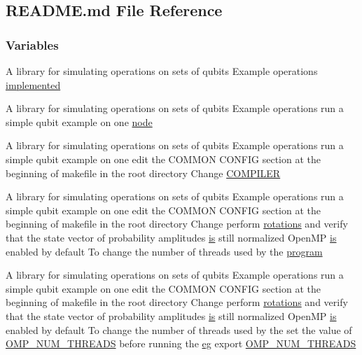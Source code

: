 \hypertarget{README_8md}{
\subsection{README.md File Reference}
\label{README_8md}
}
\subsubsection*{Variables}
\begin{DoxyCompactItemize}
\item 
A library for simulating operations on sets of qubits Example operations \hyperlink{README_8md_a5b6d5263988c72168a803d19675d481d}{implemented}
\item 
A library for simulating operations on sets of qubits Example operations run a simple qubit example on one \hyperlink{README_8md_a76fcdcc459e3177b276f62e5e4f9f987}{node}
\item 
A library for simulating operations on sets of qubits Example operations run a simple qubit example on one edit the COMMON CONFIG section at the beginning of makefile in the root directory Change \hyperlink{README_8md_ad6a8565e90f4cb2414688c39bcf9efa8}{COMPILER}
\item 
A library for simulating operations on sets of qubits Example operations run a simple qubit example on one edit the COMMON CONFIG section at the beginning of makefile in the root directory Change perform \hyperlink{README_8md_aa51a655a099aacfa420285f13958dee7}{rotations} and verify that the state vector of probability amplitudes \hyperlink{README_8md_a2a622829425af2df994a6f7c6deb0c91}{is} still normalized OpenMP \hyperlink{README_8md_a2a622829425af2df994a6f7c6deb0c91}{is} enabled by default To change the number of threads used by the \hyperlink{README_8md_ad51f198e6518042d9d4721d7ffe92d71}{program}
\item 
A library for simulating operations on sets of qubits Example operations run a simple qubit example on one edit the COMMON CONFIG section at the beginning of makefile in the root directory Change perform \hyperlink{README_8md_aa51a655a099aacfa420285f13958dee7}{rotations} and verify that the state vector of probability amplitudes \hyperlink{README_8md_a2a622829425af2df994a6f7c6deb0c91}{is} still normalized OpenMP \hyperlink{README_8md_a2a622829425af2df994a6f7c6deb0c91}{is} enabled by default To change the number of threads used by the set the value of \hyperlink{README_8md_a79266f70cc0ecc5861ae53ebd180bf65}{OMP\_\-NUM\_\-THREADS} before running the \hyperlink{README_8md_accf5ef1dd79776855485925f622a4f09}{eg} export \hyperlink{README_8md_a79266f70cc0ecc5861ae53ebd180bf65}{OMP\_\-NUM\_\-THREADS}

\end{DoxyCompactItemize}
